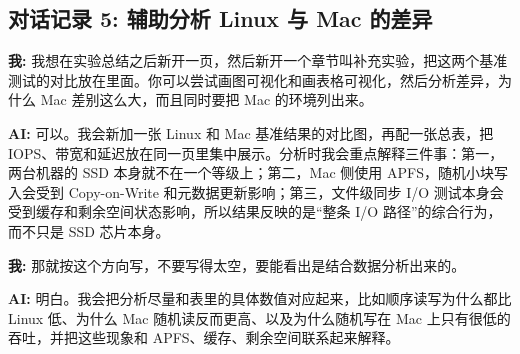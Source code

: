 \documentclass[a4paper]{article}
\begin{document}
\subsection{对话记录 5: 辅助分析 Linux 与 Mac 的差异}

\begin{tcolorbox}[colframe=blue!30!white, colback=blue!5!white, coltitle=black, title=对话内容]
\textbf{我:} 我想在实验总结之后新开一页，然后新开一个章节叫补充实验，把这两个基准测试的对比放在里面。你可以尝试画图可视化和画表格可视化，然后分析差异，为什么 Mac 差别这么大，而且同时要把 Mac 的环境列出来。

\textbf{AI:} 可以。我会新加一张 Linux 和 Mac 基准结果的对比图，再配一张总表，把 IOPS、带宽和延迟放在同一页里集中展示。分析时我会重点解释三件事：第一，两台机器的 SSD 本身就不在一个等级上；第二，Mac 侧使用 APFS，随机小块写入会受到 Copy-on-Write 和元数据更新影响；第三，文件级同步 I/O 测试本身会受到缓存和剩余空间状态影响，所以结果反映的是“整条 I/O 路径”的综合行为，而不只是 SSD 芯片本身。

\textbf{我:} 那就按这个方向写，不要写得太空，要能看出是结合数据分析出来的。

\textbf{AI:} 明白。我会把分析尽量和表里的具体数值对应起来，比如顺序读写为什么都比 Linux 低、为什么 Mac 随机读反而更高、以及为什么随机写在 Mac 上只有很低的吞吐，并把这些现象和 APFS、缓存、剩余空间联系起来解释。
\end{tcolorbox}
\end{document}

